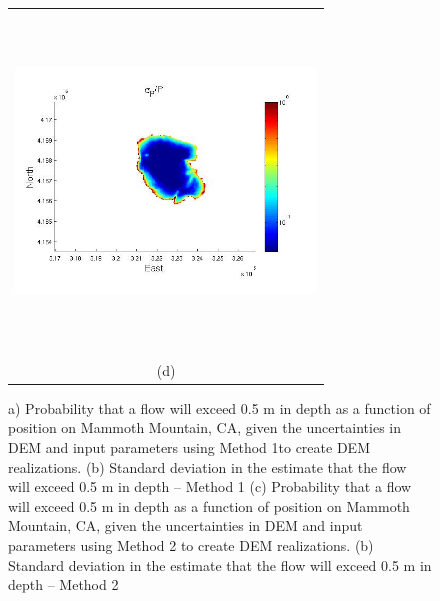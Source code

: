 \documentclass[12pt]{article}
\begin{document}
\begin{figure}[H]
\begin{minipage}{0.6\textwidth}
\begin{tabular}{c}
	\includegraphics[width=8cm,height=9cm,keepaspectratio]{figs/Mammoth_3_sigma_5m.jpg}\\
        (d)
        \end{tabular}
    \end{minipage} 
\caption{a) Probability that a flow will exceed 0.5 m in depth as a function of position on Mammoth Mountain, CA, given the uncertainties in DEM and input parameters using Method 1to create DEM realizations. (b) Standard deviation in the estimate that the flow will exceed 0.5 m in depth -- Method 1
(c) Probability that a flow will exceed 0.5 m in depth as a function of position on Mammoth Mountain, CA, given the uncertainties in DEM and input parameters using  Method 2 to create DEM realizations.
(b) Standard deviation in the estimate that the flow will exceed 0.5 m in depth -- Method 2 }
\label{fig4}  
\end{figure}
\end{document}
